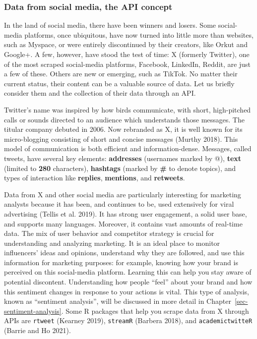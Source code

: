 \subsubsection{Data from social media, the API
concept}\label{data-from-social-media-the-api-concept}

In the land of social media, there have been winners and losers. Some social-media platforms, once ubiquitous, have now turned into little more than
websites, such as Myspace, or were entirely discontinued by their
creators, like Orkut and Google+. A few, however, have stood the test of
time: X (formerly Twitter), one of the most scraped social-media
platforms, Facebook, LinkedIn, Reddit, are just a few of these. Others are new or
emerging, such as TikTok. No matter their current status, their content
can be a valuable source of data. Let us briefly
consider them and the collection of their data through an API.

Twitter's name was inspired by how birds communicate, with short,
high-pitched calls or sounds directed to an audience which understands
those messages. The titular company debuted in 2006. Now rebranded as X,
it is well known for its micro-blogging consisting of short and concise messages (Murthy 2018). This model of
communication is both efficient and information-dense. Messages, called
tweets, have several key elements: \textbf{addresses}
(usernames marked by @), \textbf{text} (limited to \textbf{280}
characters), \textbf{hashtags} (marked by \textbf{\#} to denote topics),
and types of interaction like \textbf{replies}, \textbf{mentions}, and
\textbf{retweets}.

Data from X and other social media are particularly interesting for
marketing analysts because it has been, and continues to be,
used extensively for viral advertising (Tellis et al. 2019). It has strong user
engagement, a solid user base, and supports many languages. Moreover, it
contains vast amounts of real-time data. The mix of user behavior and
competitor strategy is crucial for understanding and analyzing marketing. It is an
ideal place to monitor influencers' ideas and opinions, understand why they are followed, and use this information for marketing purposes: for example, knowing how
your brand is perceived on this social-media platform. Learning this can
help you stay aware of potential discontent. Understanding how people
``feel'' about your brand and how this sentiment changes in response to
your actions is vital. This type of analysis, known as ``sentiment
analysis'', will be discussed in more detail in
Chapter~\ref{sec-sentiment-analysis}. Some R packages that
help you scrape data from X through APIs are \texttt{rtweet}
(Kearney 2019), \texttt{streamR} (Barbera 2018), and
\texttt{academictwitteR} (Barrie and Ho 2021).

